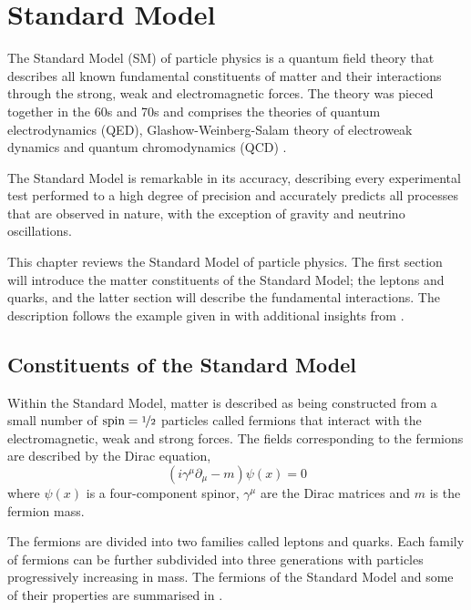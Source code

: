 \chapter{Standard Model}
\label{chap:sm}
The Standard Model (SM) of particle physics is a quantum field theory that
describes all known fundamental constituents of matter and their interactions
through the strong, weak and electromagnetic forces.  The theory was pieced
together in the 60s and 70s and comprises the theories of quantum
electrodynamics (QED), Glashow-Weinberg-Salam theory of electroweak dynamics and
quantum chromodynamics (QCD) \cite{t1972regularization, glashow1961partial,
weinberg1967model, salam1968weak}.

The Standard Model is remarkable in its accuracy, describing every experimental
test performed to a high degree of precision and accurately predicts all
processes that are observed in nature, with the exception of gravity and
neutrino oscillations.

This chapter reviews the Standard Model of particle physics. The first section will 
introduce the matter constituents of the Standard Model; the leptons and quarks,
and the latter section will describe the fundamental interactions. 
The description follows the example given in \cite{ral} with additional insights
from \cite{perkins2000introduction,griffiths2008introduction,halzen1984quarks}.

\section{Constituents of the Standard Model}
\label{sec:matter}
Within the Standard Model, matter is described as being constructed from a small
number of $\text{spin}=\nicefrac{1}{2}$ particles called fermions that interact with
the electromagnetic, weak and strong forces. 
The fields corresponding to the fermions are described by the Dirac
equation,
\begin{equation}
\left( i \gamma^{\mu} \partial_{\mu} - m \right) \psi(x) = 0
\end{equation}
where $\psi(x)$ is a four-component spinor, $\gamma^{\mu}$ are the Dirac
matrices and $m$ is the fermion mass.

The fermions are divided into two families called leptons and quarks.
Each family of fermions can be further subdivided into three generations with
particles progressively increasing in mass. The fermions of the Standard Model and
some of their properties are summarised in .


